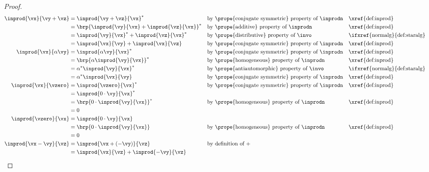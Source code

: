\begin{proof}
{\begin{align*}
  \inprod{\vx}{\vy+\vz}
    &= \inprod{\vy+\vz}{\vx}^\ast
    && \text{by \prope{conjugate symmetric} property of $\inprodn$}
    && \text{\xref{def:inprod}}
  \\&= \brp{\inprod{\vy}{\vx} + \inprod{\vz}{\vx}}^\ast
    && \text{by \prope{additive} property of $\inprodn$}
    && \text{\xref{def:inprod}}
  \\&= \inprod{\vy}{\vx}^\ast + \inprod{\vz}{\vx}^\ast
    && \text{by \prope{distributive} property of $\invo$}
    && \text{\ifxref{normalg}{def:staralg}}
  \\&= \inprod{\vx}{\vy} + \inprod{\vx}{\vz}
    && \text{by \prope{conjugate symmetric} property of $\inprodn$}
    && \text{\xref{def:inprod}}
  \\
  \inprod{\vx}{\alpha\vy}
    &= \inprod{\alpha\vy}{\vx}^\ast
    && \text{by \prope{conjugate symmetric} property of $\inprodn$}
    && \text{\xref{def:inprod}}
  \\&= \brp{\alpha\inprod{\vy}{\vx}}^\ast
    && \text{by \prope{homogeneous} property of $\inprodn$}
    && \text{\xref{def:inprod}}
  \\&= \alpha^\ast \inprod{\vy}{\vx}^\ast
    && \text{by \prope{antiautomorphic} property of $\invo$}
    && \text{\ifxref{normalg}{def:staralg}}
  \\&= \alpha^\ast \inprod{\vx}{\vy}
    && \text{by \prope{conjugate symmetric} property of $\inprodn$}
    && \text{\xref{def:inprod}}
  \\
  \inprod{\vx}{\vzero}
    &= \inprod{\vzero}{\vx}^\ast
    && \text{by \prope{conjugate symmetric} property of $\inprodn$}
    && \text{\xref{def:inprod}}
  \\&= \inprod{0\cdot\vy}{\vx}^\ast
  \\&= \brp{0\cdot\inprod{\vy}{\vx}}^\ast
    && \text{by \prope{homogeneous} property of $\inprodn$}
    && \text{\xref{def:inprod}}
  \\&= 0
  \\
  \inprod{\vzero}{\vx}
    &= \inprod{0\cdot\vy}{\vx}
  \\&= \brp{0\cdot\inprod{\vy}{\vx}}
    && \text{by \prope{homogeneous} property of $\inprodn$}
    && \text{\xref{def:inprod}}
  \\&= 0
  \\
  \inprod{\vx-\vy}{\vz}
    &= \inprod{\vx+(-\vy)}{\vz}
    && \text{by definition of $+$}
  \\&= \inprod{\vx}{\vz} + \inprod{-\vy}{\vz}

\end{align*}}
\end{proof}
